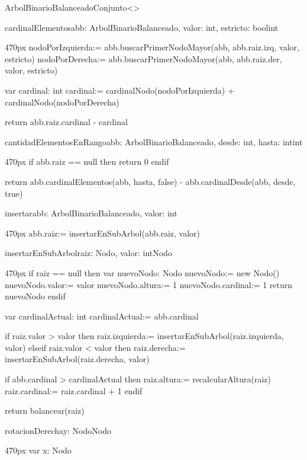 \documentclass[10pt,a4paper]{article}
\begin{document}
\begin{ModuloImplements}{ArbolBinarioBalanceado}{Conjunto<\ent>}
\begin{proc}{cardinalElementos}{\In abb: ArbolBinarioBalanceado, \In valor: int, \In estricto: bool}{int}
\begin{ImplementationCode}{470px}
      nodoPorIzquierda:= abb.buscarPrimerNodoMayor(abb, abb.raiz.izq, valor, estricto)
      nodoPorDerecha:= abb.buscarPrimerNodoMayor(abb, abb.raiz.der, valor, estricto)

      var cardinal: int
          cardinal:= cardinalNodo(nodoPorIzquierda) + cardinalNodo(nodoPorDerecha)

      return abb.raiz.cardinal - cardinal
    \end{ImplementationCode}
  \end{proc}
  \begin{proc}{cantidadElementosEnRango}{\In abb: ArbolBinarioBalanceado, \In desde: int, \In hasta: int}{int}
    \begin{ImplementationCode}{470px}
      if abb.raiz == null then
        return 0
      endif

      return abb.cardinalElementos(abb, hasta, false) - abb.cardinalDesde(abb, desde, true)
    \end{ImplementationCode}
  \end{proc}
  \begin{proc}{insertar}{\Inout abb: ArbolBinarioBalanceado, \In valor: int}{}
    \begin{ImplementationCode}{470px}
      abb.raiz:= insertarEnSubArbol(abb.raiz, valor)
    \end{ImplementationCode}
  \end{proc}
  \newpage
  \begin{proc}{insertarEnSubArbol}{\In raiz: Nodo, \In valor: int}{Nodo}
    \begin{ImplementationCode}{470px}
      if raiz == null then
        var nuevoNodo: Nodo
            nuevoNodo:= new Nodo()
            nuevoNodo.valor:= valor
            nuevoNodo.altura:= 1
            nuevoNodo.cardinal:= 1
        return nuevoNodo
      endif

      var cardinalActual: int
          cardinalActual:= abb.cardinal

      if raiz.valor > valor then
        raiz.izquierda:= insertarEnSubArbol(raiz.izquierda, valor)
      elseif raiz.valor < valor then
        raiz.derecha:= insertarEnSubArbol(raiz.derecha, valor)

      if abb.cardinal > cardinalActual then
        raiz.altura:= recalcularAltura(raiz)
        raiz.cardinal:= raiz.cardinal + 1
      endif
      
      return balancear(raiz)
    \end{ImplementationCode}
  \end{proc}
  \begin{proc}{rotacionDerecha}{\In y: Nodo}{Nodo}
    \begin{ImplementationCode}{470px}
      var x: Nodo


\end{ImplementationCode}
\end{proc}
\end{ModuloImplements}
\end{document}
